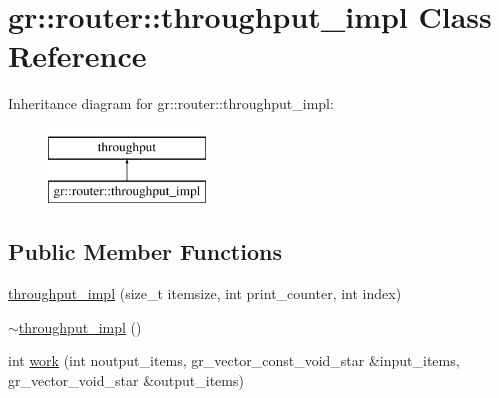 \hypertarget{classgr_1_1router_1_1throughput__impl}{\section{gr\+:\+:router\+:\+:throughput\+\_\+impl Class Reference}
\label{classgr_1_1router_1_1throughput__impl}
}
Inheritance diagram for gr\+:\+:router\+:\+:throughput\+\_\+impl\+:\begin{figure}[H]
\begin{center}
\leavevmode
\includegraphics[height=2.000000cm]{classgr_1_1router_1_1throughput__impl}
\end{center}
\end{figure}
\subsection*{Public Member Functions}
\begin{DoxyCompactItemize}
\item 
\hyperlink{classgr_1_1router_1_1throughput__impl_a4c435290b81331a3d7079e718a3b0326}{throughput\+\_\+impl} (size\+\_\+t itemsize, int print\+\_\+counter, int index)
\item 
\hyperlink{classgr_1_1router_1_1throughput__impl_a8ef92f4e626f69b8c18cb93c26969fd3}{$\sim$throughput\+\_\+impl} ()
\item 
int \hyperlink{classgr_1_1router_1_1throughput__impl_aafd5b37bbffbdb5ae5248f85fab76050}{work} (int noutput\+\_\+items, gr\+\_\+vector\+\_\+const\+\_\+void\+\_\+star \&input\+\_\+items, gr\+\_\+vector\+\_\+void\+\_\+star \&output\+\_\+items)
\end{DoxyCompactItemize}


